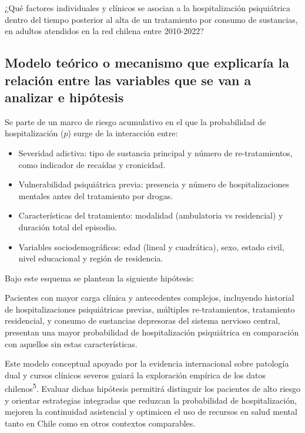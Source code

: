 \documentclass[
  spanish,
  10pt,
]{article}
\begin{document}
¿Qué factores individuales y clínicos se asocian a la hospitalización
psiquiátrica dentro del tiempo posterior al alta de un tratamiento por
consumo de sustancias, en adultos atendidos en la red chilena entre
2010-2022?

\subsection{Modelo teórico o mecanismo que explicaría la relación entre
las variables que se van a analizar e
hipótesis}\label{modelo-teuxf3rico-o-mecanismo-que-explicaruxeda-la-relaciuxf3n-entre-las-variables-que-se-van-a-analizar-e-hipuxf3tesis}

Se parte de un marco de riesgo acumulativo en el que la probabilidad de
hospitalización (\(p\)) surge de la interacción entre:

\begin{itemize}
\item
  Severidad adictiva: tipo de sustancia principal y número de
  re-tratamientos, como indicador de recaídas y cronicidad.
\item
  Vulnerabilidad psiquiátrica previa: presencia y número de
  hospitalizaciones mentales antes del tratamiento por drogas.
\item
  Características del tratamiento: modalidad (ambulatoria vs
  residencial) y duración total del episodio.
\item
  Variables sociodemográficos: edad (lineal y cuadrática), sexo, estado
  civil, nivel educacional y región de residencia.
\end{itemize}

Bajo este esquema se plantean la siguiente hipótesis:

Pacientes con mayor carga clínica y antecedentes complejos, incluyendo
historial de hospitalizaciones psiquiátricas previas, múltiples
re-tratamientos, tratamiento residencial, y consumo de sustancias
depresoras del sistema nervioso central, presentan una mayor
probabilidad de hospitalización psiquiátrica en comparación con aquellos
sin estas características.

Este modelo conceptual apoyado por la evidencia internacional sobre
patología dual y cursos clínicos severos guiará la exploración empírica
de los datos chilenos\textsuperscript{5}. Evaluar dichas hipótesis
permitirá distinguir los pacientes de alto riesgo y orientar estrategias
integradas que reduzcan la probabilidad de hospitalización, mejoren la
continuidad asistencial y optimicen el uso de recursos en salud mental
tanto en Chile como en otros contextos comparables.
\end{document}
